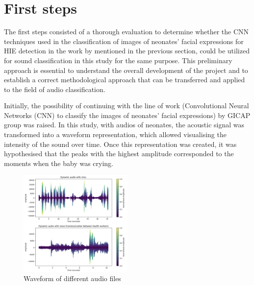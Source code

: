 \section{First steps}
The first steps consisted of a thorough evaluation to determine whether the CNN techniques used in the classification of images of neonates’ facial expressions for HIE detection in the work by mentioned in the previous section, could be utilized for sound classification in this study for the same purpose. This preliminary approach is essential to understand the overall development of the project and to establish a correct methodological approach that can be transferred and applied to the field of audio classification. 

Initially, the possibility of continuing with the line of work (Convolutional Neural Networks (CNN) to classify the images of neonates’ facial expressions) by GICAP group was raised. In this study, with audios of neonates, the acoustic signal was transformed into a waveform representation, which allowed visualising the intensity of the sound over time. Once this representation was created, it was hypothesised that the peaks with the highest amplitude corresponded to the moments when the baby was crying.

\begin{figure}[h]
\centering
    \includegraphics[width=0.5\textwidth]{figures/waveform.png}
\caption{Waveform of different audio files}
\label{fig:waveform}
\end{figure}

